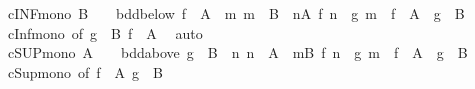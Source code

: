 \begin{isabellebody}
\isanewline
%
\endisadelimproof
\isanewline
{}\isamarkupfalse%
\ cINF{\isacharunderscore}{\kern0pt}mono{\isacharcolon}{\kern0pt}\ {\isachardoublequoteopen}B\ {\isasymnoteq}\ {\isacharbraceleft}{\kern0pt}{\isacharbraceright}{\kern0pt}\ {\isasymLongrightarrow}\ bdd{\isacharunderscore}{\kern0pt}below\ {\isacharparenleft}{\kern0pt}f\ {\isacharbackquote}{\kern0pt}\ A{\isacharparenright}{\kern0pt}\ {\isasymLongrightarrow}\ {\isacharparenleft}{\kern0pt}{\isasymAnd}m{\isachardot}{\kern0pt}\ m\ {\isasymin}\ B\ {\isasymLongrightarrow}\ {\isasymexists}n{\isasymin}A{\isachardot}{\kern0pt}\ f\ n\ {\isasymle}\ g\ m{\isacharparenright}{\kern0pt}\ {\isasymLongrightarrow}\ {\isasymSqinter}{\isacharparenleft}{\kern0pt}f\ {\isacharbackquote}{\kern0pt}\ A{\isacharparenright}{\kern0pt}\ {\isasymle}\ {\isasymSqinter}{\isacharparenleft}{\kern0pt}g\ {\isacharbackquote}{\kern0pt}\ B{\isacharparenright}{\kern0pt}{\isachardoublequoteclose}\isanewline
%
\isadelimproof
\ \ %
\endisadelimproof
%
\isatagproof
{}\isamarkupfalse%
\ cInf{\isacharunderscore}{\kern0pt}mono\ {\isacharbrackleft}{\kern0pt}of\ {\isachardoublequoteopen}g\ {\isacharbackquote}{\kern0pt}\ B{\isachardoublequoteclose}\ {\isachardoublequoteopen}f\ {\isacharbackquote}{\kern0pt}\ A{\isachardoublequoteclose}{\isacharbrackright}{\kern0pt}\ \isamarkupfalse%
\ auto%
\endisatagproof
{\isafoldproof}%
%
\isadelimproof
\isanewline
%
\endisadelimproof
\isanewline
{}\isamarkupfalse%
\ cSUP{\isacharunderscore}{\kern0pt}mono{\isacharcolon}{\kern0pt}\ {\isachardoublequoteopen}A\ {\isasymnoteq}\ {\isacharbraceleft}{\kern0pt}{\isacharbraceright}{\kern0pt}\ {\isasymLongrightarrow}\ bdd{\isacharunderscore}{\kern0pt}above\ {\isacharparenleft}{\kern0pt}g\ {\isacharbackquote}{\kern0pt}\ B{\isacharparenright}{\kern0pt}\ {\isasymLongrightarrow}\ {\isacharparenleft}{\kern0pt}{\isasymAnd}n{\isachardot}{\kern0pt}\ n\ {\isasymin}\ A\ {\isasymLongrightarrow}\ {\isasymexists}m{\isasymin}B{\isachardot}{\kern0pt}\ f\ n\ {\isasymle}\ g\ m{\isacharparenright}{\kern0pt}\ {\isasymLongrightarrow}\ {\isasymSqunion}{\isacharparenleft}{\kern0pt}f\ {\isacharbackquote}{\kern0pt}\ A{\isacharparenright}{\kern0pt}\ {\isasymle}\ {\isasymSqunion}{\isacharparenleft}{\kern0pt}g\ {\isacharbackquote}{\kern0pt}\ B{\isacharparenright}{\kern0pt}{\isachardoublequoteclose}\isanewline
%
\isadelimproof
\ \ %
\endisadelimproof
%
\isatagproof
{}\isamarkupfalse%
\ cSup{\isacharunderscore}{\kern0pt}mono\ {\isacharbrackleft}{\kern0pt}of\ {\isachardoublequoteopen}f\ {\isacharbackquote}{\kern0pt}\ A{\isachardoublequoteclose}\ {\isachardoublequoteopen}g\ {\isacharbackquote}{\kern0pt}\ B{\isachardoublequoteclose}{\isacharbrackright}{\kern0pt}\ \isamarkupfalse%

\end{isabellebody}
